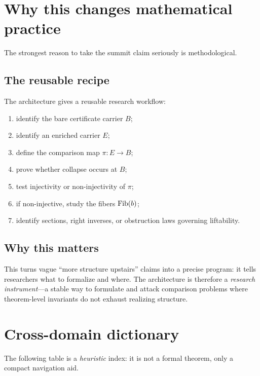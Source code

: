 \documentclass[11pt]{article}
\begin{document}
\section{Why this changes mathematical practice}\label{sec:practice}

The strongest reason to take the summit claim seriously is methodological.

\subsection{The reusable recipe}

The architecture gives a reusable research workflow:

\begin{enumerate}[label=(\arabic*)]
  \item identify the bare certificate carrier $B$;
  \item identify an enriched carrier $E$;
  \item define the comparison map $\pi : E \to B$;
  \item prove whether collapse occurs at $B$;
  \item test injectivity or non-injectivity of $\pi$;
  \item if non-injective, study the fibers $\mathrm{Fib}(b)$;
  \item identify sections, right inverses, or obstruction laws governing liftability.
\end{enumerate}

\subsection{Why this matters}

This turns vague ``more structure upstairs'' claims into a precise program: it tells
researchers what to formalize and where. The architecture is therefore a
\emph{research instrument}---a stable way to formulate and attack comparison
problems where theorem-level invariants do not exhaust realizing structure.

\section{Cross-domain dictionary}\label{sec:dictionary}

The following table is a \emph{heuristic} index: it is not a formal theorem, only a
compact navigation aid.
\end{document}
